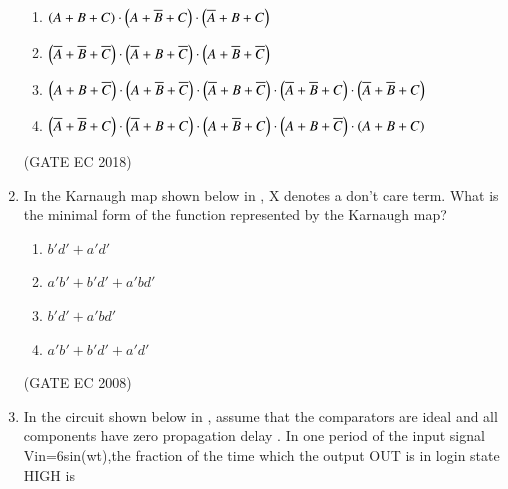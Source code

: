 \begin{enumerate}[label=\arabic*.,ref=\theenumi]
\begin{enumerate}[label=(\Alph*)]
	\item $ \left(A+B+C\right) \cdot \left(A+\overline{B}+C\right) \cdot \left(\overline{A}+B+C\right) $
 	\item $ \left(\overline{A}+\overline{B}+\overline{C}\right) \cdot \left(\overline{A}+B+\overline{C}\right) \cdot \left(A+\overline{B}+\overline{C}\right) $
	\item $ \left(A+B+\overline{C}\right) \cdot \left(A+\overline{B}+\overline{C}\right) \cdot \left(\overline{A}+B+\overline{C}\right) \cdot \left(\overline{A}+\overline{B}+C\right) \cdot \left(\overline{A}+\overline{B}+C\right) $
	\item $ \left(\overline{A}+\overline{B}+C\right) \cdot \left(\overline{A}+B+C\right) \cdot \left(A+\overline{B}+C\right) \cdot \left(A+B+\overline{C}\right) \cdot \left(A+B+C\right) $
\end{enumerate}
\hfill(GATE EC 2018)
    \item 
  \label{prob:gate  CS-5}

In the Karnaugh map shown below in , X denotes a don't care term. What is the minimal form of the function represented by the Karnaugh map?
    \begin{figure}[!ht]
\centering
{}
        \caption{}
        \label{fig:GATE EC 2008}
    \end{figure}
\begin{enumerate}[label=(\Alph*)]
  \item $ b'd'+a'd' $
  \item $ a'b'+b'd'+a'bd' $
  \item $ b'd'+a'bd' $
  \item $ a'b'+b'd'+a'd' $

\end{enumerate}
\hfill(GATE EC 2008)

\iffalse
    \item 
        \label{prob:gate EC 9}
	 In the circuit shown below in , assume that the comparators are ideal and all components have zero propagation delay . In one period of the input signal Vin=6sin(wt),the fraction of the time which the output OUT is in login state HIGH is 


\end{enumerate}

